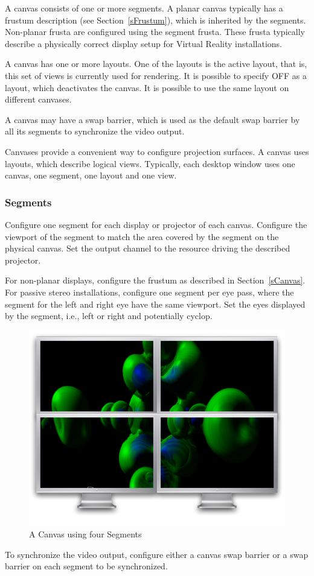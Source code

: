 \documentclass[10pt,a4]{scrartcl}
\newcommand{\sref}[1]{Section~\ref{#1}}
\begin{document}
A canvas consists of one or more segments. A planar canvas typically has
a frustum description (see \sref{sFrustum}), which is inherited by the
segments. Non-planar frusta are configured using the segment
frusta. These frusta typically describe a physically correct display
setup for Virtual Reality installations.

A canvas has one or more layouts. One of the layouts is the active
layout, that is, this set of views is currently used for rendering. It
is possible to specify \textsf{OFF} as a layout, which deactivates the
canvas. It is possible to use the same layout on different canvases.

A canvas may have a swap barrier, which is used as the default swap barrier by
all its segments to synchronize the video output.

Canvases provide a convenient way to configure projection surfaces. A canvas
uses layouts, which describe logical views. Typically, each desktop window uses
one canvas, one segment, one layout and one view.

\subsubsection{Segments}

Configure one \textsf{segment} for each display or projector of each
canvas. Configure the \textsf{viewport} of the segment to match the area
covered by the segment on the physical canvas. Set the output
\textsf{channel} to the resource driving the described projector.

For non-planar displays, configure the frustum as described in
\sref{sCanvas}. For passive stereo installations, configure one segment per eye
pass, where the segment for the left and right eye have the same viewport. Set
the eyes displayed by the segment, i.e., left or right and potentially cyclop.

\begin{figure}
  \includegraphics[width=.382\textwidth]{images/canvas.pdf}
  {\caption{\label{fCanvas}A Canvas using four Segments}}
\end{figure}
To synchronize the video output, configure either a canvas swap barrier or a
swap barrier on each segment to be synchronized.
\end{document}
